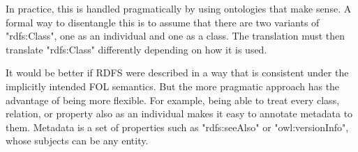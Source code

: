 In practice, this is handled pragmatically by using ontologies that make sense.
A formal way to disentangle this is to assume that there are two variants of "rdfs:Class", one as an individual and one as a class.
The translation must then translate "rdfs:Class" differently depending on how it is used.

It would be better if RDFS were described in a way that is consistent under the implicitly intended FOL semantics.
But the more pragmatic approach has the advantage of being more flexible.
For example, being able to treat every class, relation, or property also as an individual makes it easy to annotate metadata to them.
Metadata is a set of properties such as "rdfs:seeAlso" or "owl:versionInfo", whose subjects can be any entity.